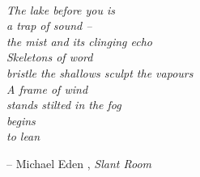 \thispagestyle{empty}

\phantom{~}\\[2em]
\textit{
\noindent\phantom{~~~~~~~~~~~~~~~}The lake before you is\\
 \phantom{~~~~~~~~~~~~~~~}a trap of sound --\\
 \phantom{~~~~~~~~~~~~~~~}the mist and its clinging echo\\
 \phantom{~~~~~~~~~~~~~~~~~~~~~~~~~~~} Skeletons of word\\
 \phantom{~~~~~~~~~~~~~~~} bristle the shallows\phantom{~~~} sculpt the vapours\\[1em]
 \phantom{~~~~~~~~~~~~~~~}A frame of wind\\
 \phantom{~~~~~~~~~~~~~~~}stands stilted in the fog\\[1em]
 \phantom{~~~~~~~~~~~~~~~}begins\\[2em]
 \phantom{~~~~~~~~~~~~~~~~~~~~~~~~~~~} to lean
}

\vfill

\begin{flushright}
-- Michael Eden \citeauthor{Reynolds2009}, \textsl{Slant Room}\\[3em]
\end{flushright}
